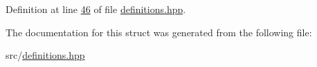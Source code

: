 Definition at line \hyperlink{definitions_8hpp_source_l00046}{46} of file \hyperlink{definitions_8hpp_source}{definitions.\+hpp}.



The documentation for this struct was generated from the following file\+:\begin{DoxyCompactItemize}
\item 
src/\hyperlink{definitions_8hpp}{definitions.\+hpp}\end{DoxyCompactItemize}

